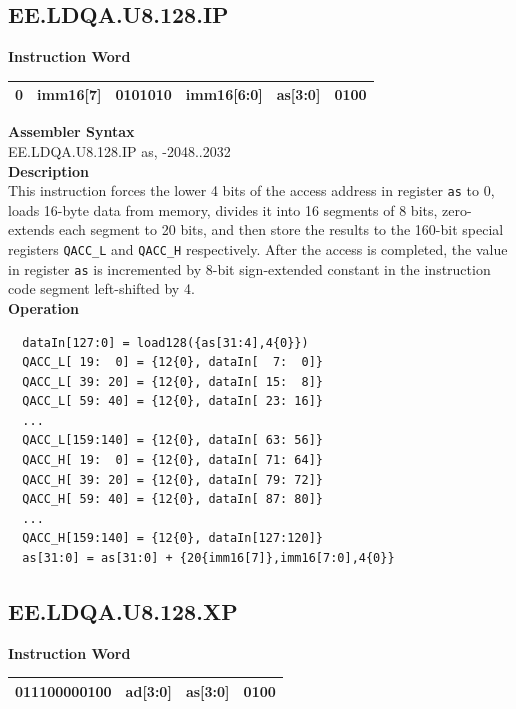 \clearpage
\subsection{EE.LDQA.U8.128.IP}\label{instruction:EELDQAU8128IP}
\setlength\tabcolsep{6pt}
\textbf{Instruction Word} \\
\begin{tabular}{|c|c|c|c|c|c|}
	\hline
	0 & imm16[7] & 0101010 & imm16[6:0] & as[3:0] & 0100 \\
	\hline
\end{tabular}

\textbf{Assembler Syntax} \\
EE.LDQA.U8.128.IP as, -2048..2032 \\
\textbf{Description} \\
This instruction forces the lower 4 bits of the access address in register \lstinline{as} to 0, loads 16-byte data from memory, divides it into 16 segments of 8 bits, zero-extends each segment to 20 bits, and then store the results to the 160-bit special registers \lstinline{QACC_L} and \lstinline{QACC_H} respectively. After the access is completed, the value in register \lstinline{as} is incremented by 8-bit sign-extended constant in the instruction code segment left-shifted by 4.\\
\textbf{Operation}
\begin{lstlisting}
  dataIn[127:0] = load128({as[31:4],4{0}})
  QACC_L[ 19:  0] = {12{0}, dataIn[  7:  0]}
  QACC_L[ 39: 20] = {12{0}, dataIn[ 15:  8]}
  QACC_L[ 59: 40] = {12{0}, dataIn[ 23: 16]}
  ...
  QACC_L[159:140] = {12{0}, dataIn[ 63: 56]}
  QACC_H[ 19:  0] = {12{0}, dataIn[ 71: 64]}
  QACC_H[ 39: 20] = {12{0}, dataIn[ 79: 72]}
  QACC_H[ 59: 40] = {12{0}, dataIn[ 87: 80]}
  ...
  QACC_H[159:140] = {12{0}, dataIn[127:120]}
  as[31:0] = as[31:0] + {20{imm16[7]},imm16[7:0],4{0}}
\end{lstlisting}

\clearpage
\subsection{EE.LDQA.U8.128.XP}\label{instruction:EELDQAU8128XP}
\setlength\tabcolsep{6pt}
\textbf{Instruction Word} \\
\begin{tabular}{|c|c|c|c|}
	\hline
	011100000100 & ad[3:0] & as[3:0] & 0100 \\
	\hline
\end{tabular}

